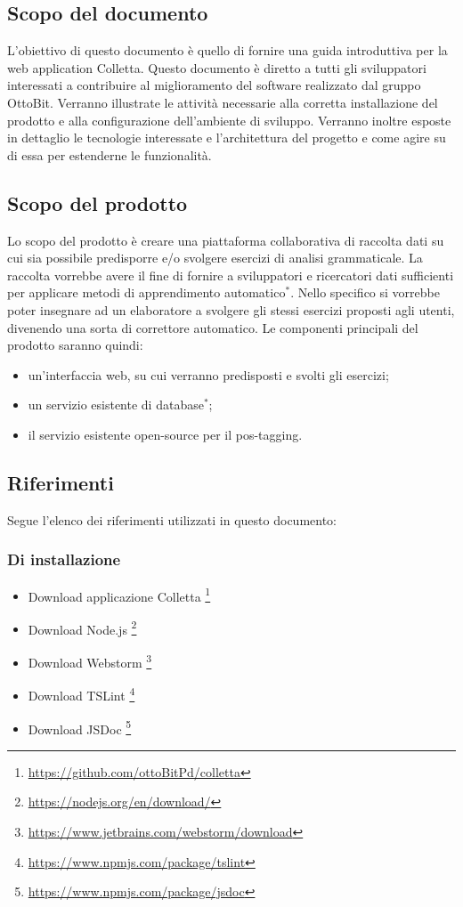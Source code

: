 \subsection{Scopo del documento}
L'obiettivo di questo documento è quello di fornire una guida introduttiva per la web application Colletta. Questo documento è  diretto a tutti gli sviluppatori interessati a contribuire al miglioramento del software realizzato dal gruppo OttoBit. Verranno illustrate le attività necessarie alla corretta installazione del prodotto e alla configurazione dell'ambiente di sviluppo. Verranno inoltre esposte in dettaglio le tecnologie interessate e l'architettura del progetto e come agire su di essa per estenderne le funzionalità.
\subsection{Scopo del prodotto}
Lo scopo del prodotto è creare una piattaforma collaborativa di raccolta dati su cui sia possibile predisporre e/o svolgere esercizi di analisi grammaticale. La raccolta vorrebbe avere il fine di fornire a sviluppatori e ricercatori dati sufficienti per applicare metodi di apprendimento automatico$^*$. Nello specifico si vorrebbe poter insegnare ad un elaboratore a svolgere gli stessi esercizi proposti agli utenti, divenendo una sorta di correttore automatico.  
Le componenti principali del prodotto saranno quindi:
\begin{itemize}
	\item un'interfaccia web, su cui verranno predisposti e svolti gli esercizi;
	\item un servizio esistente di database$^*$;
	\item il servizio esistente open-source per il pos-tagging.
\end{itemize}
\subsection{Riferimenti}
Segue l'elenco dei riferimenti utilizzati in questo documento:
\subsubsection{Di installazione}
	\begin{itemize}
	\item Download applicazione Colletta
	\footnote{\url {https://github.com/ottoBitPd/colletta}}
	\item Download Node.js
	\footnote{\url {https://nodejs.org/en/download/}}
	\item Download Webstorm
	\footnote{\url {https://www.jetbrains.com/webstorm/download}}
	\item Download TSLint
	\footnote{\url {https://www.npmjs.com/package/tslint}}
	\item Download JSDoc
	\footnote{\url {https://www.npmjs.com/package/jsdoc}}
	
\end{itemize}

